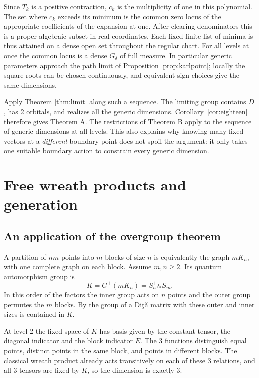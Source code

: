 \documentclass[11pt,a4paper]{amsart}
\begin{document}
Since $T_k$ is a positive contraction, $c_k$ is the multiplicity of one in this polynomial. The set where $c_k$ exceeds its minimum is the common zero locus of the appropriate coefficients of the expansion at one. After clearing denominators this is a proper algebraic subset in real coordinates. Each fixed finite list of minima is thus attained on a dense open set throughout the regular chart. For all levels at once the common locus is a dense $G_\delta$ of full measure. In particular generic parameters approach the path limit of Proposition \ref{prop:karlpoint}; locally the square roots can be chosen continuously, and equivalent sign choices give the same dimensions.

Apply Theorem \ref{thm:limit} along such a sequence. The limiting group contains $D$, has 2 orbitals, and realizes all the generic dimensions. Corollary~\ref{cor:eighteen} therefore gives Theorem A. The restrictions of Theorem B apply to the sequence of generic dimensions at all levels. This also explains why knowing many fixed vectors at a \emph{different} boundary point does not spoil the argument: it only takes one suitable boundary action to constrain every generic dimension.

\section{Free wreath products and generation}\label{sec:free}

\subsection{An application of the overgroup theorem}
A partition of $nm$ points into $m$ blocks of size $n$ is equivalently the graph $mK_n$, with one complete graph on each block. Assume $m,n\geq2$. Its quantum automorphism group is
\[
 K=G^+(mK_n)=S_n^+\wr_* S_m^+ .
\]
In this order of the factors the inner group acts on $n$ points and the outer group permutes the $m$ blocks. By \cite[Proposition 4.1]{bo} the group of a Di\c t\u a matrix with these outer and inner sizes is contained in $K$.

At level 2 the fixed space of $K$ has basis given by the constant tensor, the diagonal indicator and the block indicator $E$. The 3 functions distinguish equal points, distinct points in the same block, and points in different blocks. The classical wreath product already acts transitively on each of these 3 relations, and all 3 tensors are fixed by $K$, so the dimension is exactly 3.
\end{document}
